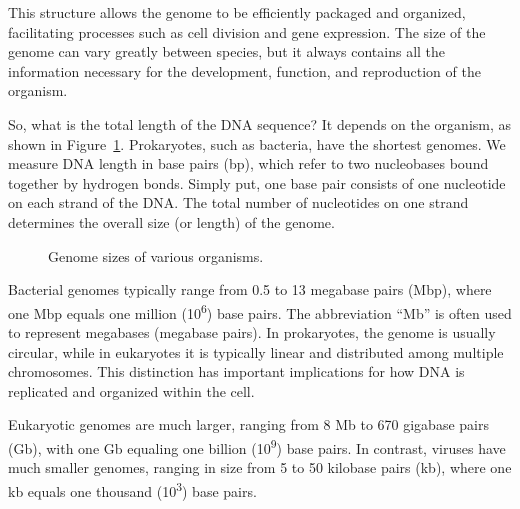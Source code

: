 This structure allows the genome to be efficiently packaged and organized, facilitating processes such as cell division and gene expression. The size of the genome can vary greatly between species, but it always contains all the information necessary for the development, function, and reproduction of the organism.

So, what is the total length of the DNA sequence? It depends on the organism, as shown in Figure~\ref{fig:g-genome-size}. Prokaryotes, such as bacteria, have the shortest genomes. We measure DNA length in base pairs (bp), which refer to two nucleobases bound together by hydrogen bonds. Simply put, one base pair consists of one nucleotide on each strand of the DNA. The total number of nucleotides on one strand determines the overall size (or length) of the genome.

\begin{figure}
    \caption[6pt]{Genome sizes of various organisms.}
    \label{fig:g-genome-size}
  \end{figure}

Bacterial genomes typically range from 0.5 to 13 megabase pairs (Mbp), where one Mbp equals one million (10\textsuperscript{6}) base pairs. The abbreviation ``Mb'' is often used to represent megabases (megabase pairs). In prokaryotes, the genome is usually circular, while in eukaryotes it is typically linear and distributed among multiple chromosomes. This distinction has important implications for how DNA is replicated and organized within the cell.

Eukaryotic genomes are much larger, ranging from 8 Mb to 670 gigabase pairs (Gb), with one Gb equaling one billion (10\textsuperscript{9}) base pairs. In contrast, viruses have much smaller genomes, ranging in size from 5 to 50 kilobase pairs (kb), where one kb equals one thousand (10\textsuperscript{3}) base pairs.

